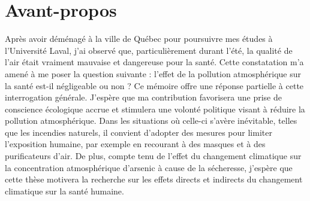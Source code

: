 \section*{Avant-propos}
Après avoir déménagé à la ville de Québec pour poursuivre mes études à l’Université Laval, j’ai observé que, particulièrement durant l’été, la qualité de l’air était vraiment mauvaise et dangereuse pour la santé. Cette constatation m’a amené à me poser la question suivante : l’effet de la pollution atmosphérique sur la santé est-il négligeable ou non ? Ce mémoire offre une réponse partielle à cette interrogation générale. J’espère que ma contribution favorisera une prise de conscience écologique accrue et stimulera une volonté politique visant à réduire la pollution atmosphérique. Dans les situations où celle-ci s’avère inévitable, telles que les incendies naturels, il convient d’adopter des mesures pour limiter l’exposition humaine, par exemple en recourant à des masques et à des purificateurs d’air. De plus, compte tenu de l’effet du changement climatique sur la concentration atmosphérique d’arsenic à cause de la sécheresse, j’espère que cette thèse motivera la recherche sur les effets directs et indirects du changement climatique sur la santé humaine.